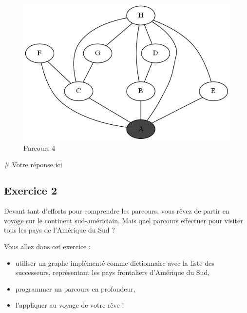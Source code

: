 \documentclass[
  a4paper,
  DIV=11,
  numbers=noendperiod]{scrartcl}
\newenvironment{Shaded}{\begin{snugshade}}{\end{snugshade}}
\newcommand{\CommentTok}[1]{\textcolor[rgb]{0.37,0.37,0.37}{#1}}
\providecommand{\tightlist}{%
  \setlength{\itemsep}{0pt}\setlength{\parskip}{0pt}}\usepackage{longtable,booktabs,array}
\begin{document}
\begin{figure}

{\centering \includegraphics{exos_graphes_fiche1_files/mediabag/a2_reperer_profondeu123.gif}

}

\caption{Parcours 4}

\end{figure}

\begin{Shaded}
\begin{Highlighting}[]
\CommentTok{\# Votre réponse ici}
\end{Highlighting}
\end{Shaded}

\hypertarget{exercice-2}{%
\subsection{Exercice 2}\label{exercice-2}}

Devant tant d'efforts pour comprendre les parcours, vous rêvez de partir
en voyage sur le continent sud-américiain. Mais quel parcours effectuer
pour visiter tous les pays de l'Amérique du Sud ?

Vous allez dans cet exercice :

\begin{itemize}
\tightlist
\item
  utiliser un graphe implémenté comme dictionnaire avec la liste des
  successeurs, représentant les pays frontaliers d'Amérique du Sud,
\item
  programmer un parcours en profondeur,
\item
  l'appliquer au voyage de votre rêve !
\end{itemize}
\end{document}
